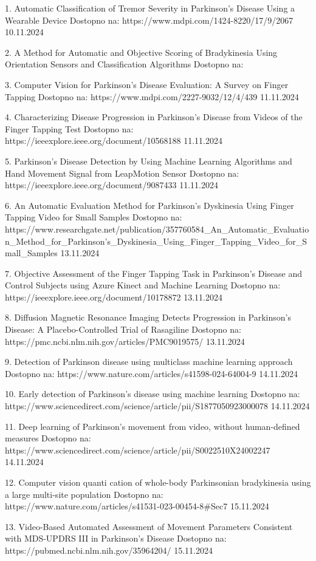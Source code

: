 1. Automatic Classification of Tremor Severity in Parkinson’s Disease Using a Wearable Device
Dostopno na: https://www.mdpi.com/1424-8220/17/9/2067
10.11.2024

2. A Method for Automatic and Objective Scoring of Bradykinesia Using Orientation Sensors and Classification Algorithms
Dostopno na: 

3. Computer Vision for Parkinson’s Disease Evaluation: A Survey on Finger Tapping
Dostopno na: https://www.mdpi.com/2227-9032/12/4/439
11.11.2024

4. Characterizing Disease Progression in Parkinson’s Disease from Videos of the Finger Tapping Test
Dostopno na: https://ieeexplore.ieee.org/document/10568188
11.11.2024

5. Parkinson’s Disease Detection by Using Machine Learning Algorithms and Hand Movement Signal from LeapMotion Sensor
Dostopno na: https://ieeexplore.ieee.org/document/9087433
11.11.2024

6. An Automatic Evaluation Method for Parkinson's Dyskinesia Using Finger Tapping Video for Small Samples
Dostopno na: https://www.researchgate.net/publication/357760584_An_Automatic_Evaluation_Method_for_Parkinson's_Dyskinesia_Using_Finger_Tapping_Video_for_Small_Samples 
13.11.2024

7. Objective Assessment of the Finger Tapping Task in Parkinson’s Disease and Control Subjects using Azure Kinect and Machine Learning
Dostopno na: https://ieeexplore.ieee.org/document/10178872
13.11.2024

8. Diffusion Magnetic Resonance Imaging Detects Progression in Parkinson’s Disease: A Placebo-Controlled Trial of Rasagiline
Dostopno na: https://pmc.ncbi.nlm.nih.gov/articles/PMC9019575/
13.11.2024

9. Detection of Parkinson disease using multiclass machine learning approach
Dostopno na: https://www.nature.com/articles/s41598-024-64004-9
14.11.2024

10. Early detection of Parkinson’s disease using machine learning
Dostopno na: https://www.sciencedirect.com/science/article/pii/S1877050923000078
14.11.2024

11. Deep learning of Parkinson's movement from video, without human-defined measures
Dostopno na: https://www.sciencedirect.com/science/article/pii/S0022510X24002247
14.11.2024

12. Computer vision quanti cation of whole-body Parkinsonian bradykinesia using a large multi-site population
Dostopno na: https://www.nature.com/articles/s41531-023-00454-8#Sec7
15.11.2024

13. Video-Based Automated Assessment of Movement Parameters Consistent with MDS-UPDRS III in Parkinson's Disease
Dostopno na: https://pubmed.ncbi.nlm.nih.gov/35964204/
15.11.2024


